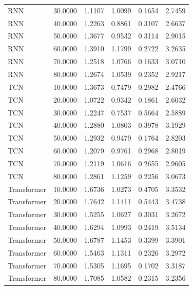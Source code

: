 \begin{tabular}{lrrrrr}
RNN & 30.0000 & 1.1107 & 1.0099 & 0.1654 & 2.7459 \\
RNN & 40.0000 & 1.2263 & 0.8861 & 0.3107 & 2.6637 \\
RNN & 50.0000 & 1.3677 & 0.9532 & 0.3114 & 2.9015 \\
RNN & 60.0000 & 1.3910 & 1.1799 & 0.2722 & 3.2635 \\
RNN & 70.0000 & 1.2518 & 1.0766 & 0.1633 & 3.0710 \\
RNN & 80.0000 & 1.2674 & 1.0539 & 0.2352 & 2.9217 \\
TCN & 10.0000 & 1.3673 & 0.7479 & 0.2982 & 2.4766 \\
TCN & 20.0000 & 1.0722 & 0.9342 & 0.1861 & 2.6032 \\
TCN & 30.0000 & 1.2247 & 0.7537 & 0.5664 & 2.5889 \\
TCN & 40.0000 & 1.2880 & 1.0803 & 0.3978 & 3.1929 \\
TCN & 50.0000 & 1.2932 & 0.9479 & 0.1764 & 2.8203 \\
TCN & 60.0000 & 1.2079 & 0.9761 & 0.2968 & 2.8019 \\
TCN & 70.0000 & 1.2119 & 1.0616 & 0.2655 & 2.9605 \\
TCN & 80.0000 & 1.2861 & 1.1259 & 0.2256 & 3.0673 \\
Transformer & 10.0000 & 1.6736 & 1.0273 & 0.4705 & 3.3532 \\
Transformer & 20.0000 & 1.7642 & 1.1411 & 0.5443 & 3.4738 \\
Transformer & 30.0000 & 1.5255 & 1.0627 & 0.3031 & 3.2672 \\
Transformer & 40.0000 & 1.6294 & 1.0993 & 0.2419 & 3.5134 \\
Transformer & 50.0000 & 1.6787 & 1.1453 & 0.3399 & 3.3901 \\
Transformer & 60.0000 & 1.5463 & 1.1311 & 0.2326 & 3.2972 \\
Transformer & 70.0000 & 1.5305 & 1.1695 & 0.1702 & 3.3187 \\
Transformer & 80.0000 & 1.7085 & 1.0582 & 0.2315 & 3.2356 \\
\bottomrule
\end{tabular}

